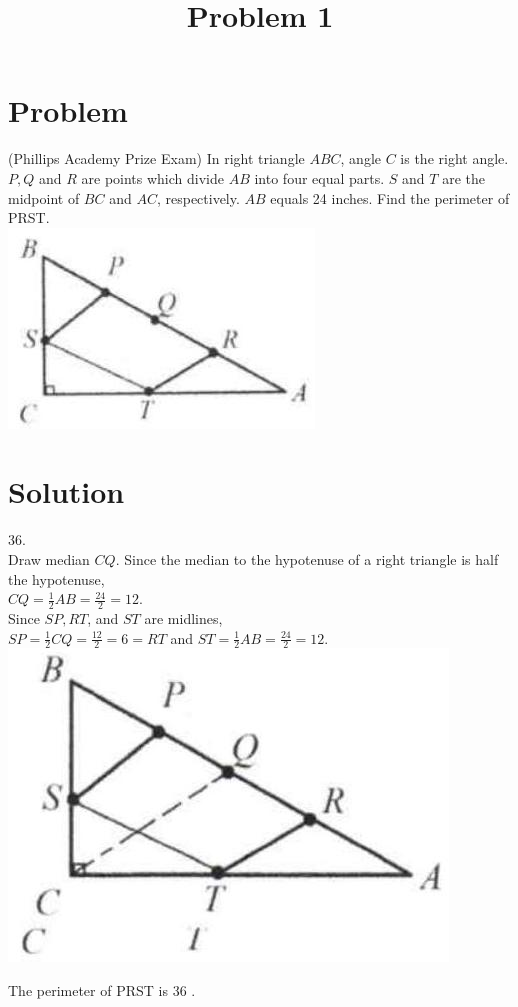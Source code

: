 \documentclass{article}
\title{Problem 1}
\date{}
\begin{document}
\maketitle

\section*{Problem}
(Phillips Academy Prize Exam) In right triangle \(A B C\), angle \(C\) is the right angle. \(P, Q\) and \(R\) are points which divide \(A B\) into four equal parts. \(S\) and \(T\) are the midpoint of \(B C\) and \(A C\), respectively. \(A B\) equals 24 inches. Find the perimeter of PRST.\\
\centering
\includegraphics[width=\textwidth]{images/problem_image_1.jpg}

\section*{Solution}
36.\\
Draw median \(C Q\). Since the median to the hypotenuse of a right triangle is half the hypotenuse,\\
\(C Q=\frac{1}{2} A B=\frac{24}{2}=12\).\\
Since \(S P, R T\), and \(S T\) are midlines,\\
\(S P=\frac{1}{2} C Q=\frac{12}{2}=6=R T\) and \(S T=\frac{1}{2} A B=\frac{24}{2}=12\).\\
\centering
\includegraphics[width=\textwidth]{images/reasoning_image_1.jpg}

The perimeter of PRST is 36 .
\end{document}
